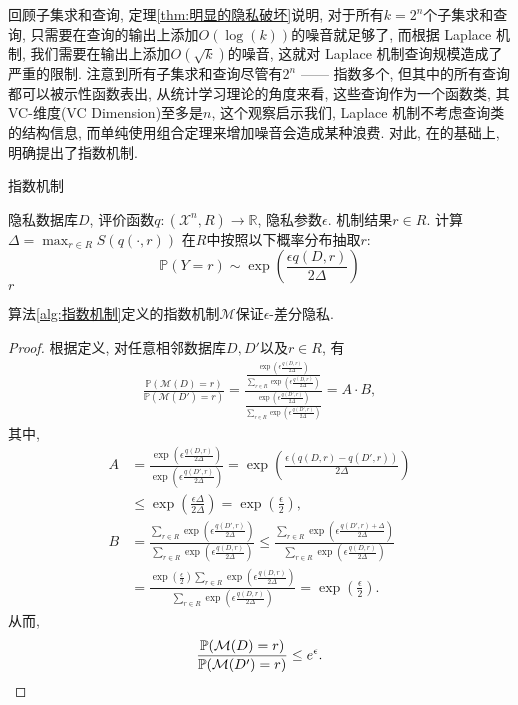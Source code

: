 回顾子集求和查询, 定理\ref{thm:明显的隐私破坏}说明, 对于所有$k = 2^n$个子集求和查询, 只需要在查询的输出上添加$O\left(\log(k)\right)$的噪音就足够了, 而根据 Laplace 机制, 我们需要在输出上添加$O\left(\sqrt{k}\right)$的噪音, 这就对 Laplace 机制查询规模造成了严重的限制. 注意到所有子集求和查询尽管有$2^n$ ------ 指数多个, 但其中的所有查询都可以被示性函数表出, 从统计学习理论的角度来看, 这些查询作为一个函数类, 其VC-维度(VC Dimension)至多是$n$, 这个观察启示我们, Laplace 机制不考虑查询类的结构信息, 而单纯使用组合定理来增加噪音会造成某种浪费. 对此, 在\parencite{dwork_calibrating_2006}的基础上, \parencite{mcsherry2007mechanism}明确提出了指数机制.

\begin{algorithm}[htbp]
  \caption{指数机制}\label{alg:指数机制}
  \begin{algorithmic}[1]
    \REQUIRE 隐私数据库$D$, 评价函数$q\colon (\mathcal{X}^n, R) \to \mathbb R$, 隐私参数$\epsilon$.
    \ENSURE 机制结果$r \in R$.
    \STATE 计算$\Delta = \max_{r\in R} S(q(\cdot, r))$
    \STATE 在$R$中按照以下概率分布抽取$r$:
    \[
      \mathbb P(Y = r) \sim \exp\left(\frac{\epsilon q(D, r)}{2\Delta}\right)
    \]
    \RETURN $r$
  \end{algorithmic}
\end{algorithm}
\begin{thm}[指数机制的隐私性]\label{thm:指数机制的隐私性}
  算法\ref{alg:指数机制}定义的指数机制$\mathcal{M}$保证$\epsilon$-差分隐私.
\end{thm}
\begin{proof}
  根据定义, 对任意相邻数据库$D, D'$以及$r\in R$, 有
  \[
    \begin{split}
      \frac{\mathbb{P}(\mathcal{M}(D) = r)}{\mathbb{P}(\mathcal{M}(D') = r)} = \frac{\frac{\exp\left(\epsilon \frac{q(D, r)}{2\Delta}\right)}{\sum_{r\in R} \exp\left(\epsilon \frac{q(D, r)}{2\Delta}\right)}}{\frac{\exp\left(\epsilon \frac{q(D', r)}{2\Delta}\right)}{\sum_{r\in R} \exp\left(\epsilon \frac{q(D', r)}{2\Delta}\right)}} = A \cdot B,
    \end{split}
  \]
  其中, 
  \begin{align*}
    A &= \frac{\exp\left(\epsilon \frac{q(D, r)}{2\Delta}\right)}{\exp\left(\epsilon \frac{q(D', r)}{2\Delta}\right)} = \exp\left(\frac{\epsilon(q(D, r) - q(D', r))}{2\Delta}\right) \\
    & \le \exp\left(\frac{\epsilon\Delta}{2\Delta}\right) = \exp\left(\frac{\epsilon}{2}\right), \\
    B &= \frac{\sum_{r\in R}\exp\left(\epsilon \frac{q(D', r)}{2\Delta}\right)}{\sum_{r\in R}\exp\left(\epsilon \frac{q(D, r)}{2\Delta}\right)} \le \frac{\sum_{r\in R}\exp\left(\epsilon \frac{q(D', r) + \Delta}{2\Delta}\right)}{\sum_{r\in R}\exp\left(\epsilon \frac{q(D, r)}{2\Delta}\right)} \\
    &= \frac{\exp(\frac{\epsilon}{2}) \sum_{r\in R}\exp\left(\epsilon \frac{q(D, r)}{2\Delta}\right)}{\sum_{r\in R}\exp\left(\epsilon \frac{q(D, r)}{2\Delta}\right)} = \exp\left(\frac{\epsilon}{2}\right).
  \end{align*}
  从而,
  \[
    \frac{\mathbb{P}(\mathcal{M}(D) = r)}{\mathbb{P}(\mathcal{M}(D') = r)} \le e^\epsilon. \qedhere
  \]
\end{proof}
